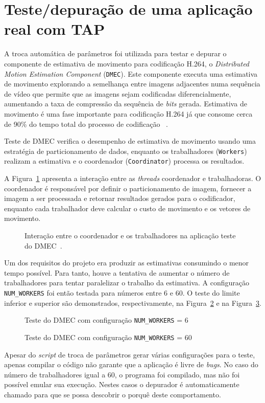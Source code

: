\documentclass[conference]{IEEEtran}
\newcommand{\fig}[4][h]{
  \begin{figure}[#1] {\centering{\texttt{[image: fig/\#2]}}\par}
    \caption{#3\label{fig:#2}}
  \end{figure}
}
\begin{document}
\section{Teste/depuração de uma aplicação real com TAP}
\label{sec:case_study}
A troca automática de parâmetros foi utilizada para testar e depurar o componente de estimativa de movimento para codificação H.264, o \textit{Distributed Motion Estimation Component} (\texttt{DMEC}). Este componente executa uma estimativa de movimento explorando a semelhança entre imagens adjacentes numa sequência de vídeo que permite que as imagens sejam codificadas diferencialmente, aumentando a taxa de compressão da sequência de \textit{bits} gerada. Estimativa de movimento é uma fase importante para codificação H.264 já que consome cerca de 90\% do tempo total do processo de codificação ~\cite{DMEC}.

Teste de DMEC verifica o desempenho de estimativa de movimento usando uma estratégia de particionamento de dados, enquanto os trabalhadores (\texttt{Workers}) realizam a estimativa e o coordenador (\texttt{Coordinator}) processa os resultados.

A Figura~\ref{fig:dmec} apresenta a interação entre as \textit{threads} coordenador e trabalhadoras. O coordenador é responsável por definir o particionamento de imagem, fornecer a imagem a ser processada e retornar resultados gerados para o codificador, enquanto cada trabalhador deve calcular o custo de movimento e os vetores de movimento.

\fig{dmec}{Interação entre o coordenador e os trabalhadores na aplicação teste do DMEC~\cite{DMEC}.}{scale=.4}

Um dos requisitos do projeto era produzir as estimativas consumindo o menor tempo possível. Para tanto, houve a tentativa de aumentar o número de trabalhadores para tentar paralelizar o trabalho da estimativa. A configuração \texttt{NUM\_WORKERS} foi então testada para números entre 6 e 60. O teste do limite inferior e superior são demonstrados, respectivamente, na Figura~\ref{fig:qemu_dmec_6_workers} e na Figura~\ref{fig:qemu_dmec_60_workers}. 

\fig{qemu_dmec_6_workers}{Teste do DMEC com configuração \texttt{NUM\_WORKERS} = 6}{scale=.4} \fig{qemu_dmec_60_workers}{Teste do DMEC com configuração \texttt{NUM\_WORKERS} = 60}{scale=.4}

Apesar do \textit{script} de troca de parâmetros gerar várias configurações para o teste, apenas compilar o código não garante que a aplicação é livre de \textit{bugs}. No caso do número de trabalhadores igual a 60, o programa foi compilado, mas não foi possível emular sua execução. Nestes casos o depurador é automaticamente chamado para que se possa descobrir o porquê deste comportamento. 
\end{document}
